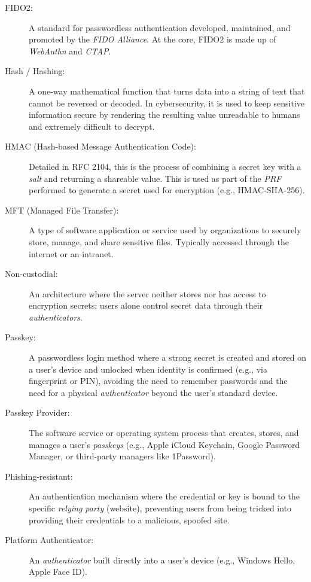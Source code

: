 \begin{description}
\item[FIDO2:] A standard for passwordless authentication developed, maintained, and promoted by the \textit{FIDO Alliance}. At the core, FIDO2 is made up of \textit{WebAuthn} and \textit{CTAP}.

\item[Hash / Hashing:] A one-way mathematical function that turns data into a string of text that cannot be reversed or decoded. In cybersecurity, it is used to keep sensitive information secure by rendering the resulting value unreadable to humans and extremely difficult to decrypt. 

\item[HMAC (Hash-based Message Authentication Code):] Detailed in RFC 2104, this is the process of combining a secret key with a \textit{salt} and returning a shareable value. This is used as part of the \textit{PRF} performed to generate a secret used for encryption (e.g., HMAC-SHA-256). 

\item[MFT (Managed File Transfer):] A type of software application or service used by organizations to securely store, manage, and share sensitive files. Typically accessed through the internet or an intranet. 

\item[Non-custodial:] An architecture where the server neither stores nor has access to encryption secrets; users alone control secret data through their \textit{authenticators}. 

\item[Passkey:] A passwordless login method where a strong secret is created and stored on a user’s device and unlocked when identity is confirmed (e.g., via fingerprint or PIN), avoiding the need to remember passwords and the need for a physical \textit{authenticator} beyond the user’s standard device.

\item[Passkey Provider:] The software service or operating system process that creates, stores, and manages a user's \textit{passkeys} (e.g., Apple iCloud Keychain, Google Password Manager, or third-party managers like 1Password).

\item[Phishing-resistant:] An authentication mechanism where the credential or key is bound to the specific \textit{relying party} (website), preventing users from being tricked into providing their credentials to a malicious, spoofed site.

\item[Platform Authenticator:] An \textit{authenticator} built directly into a user's device (e.g., Windows Hello, Apple Face ID). 


\end{description}
